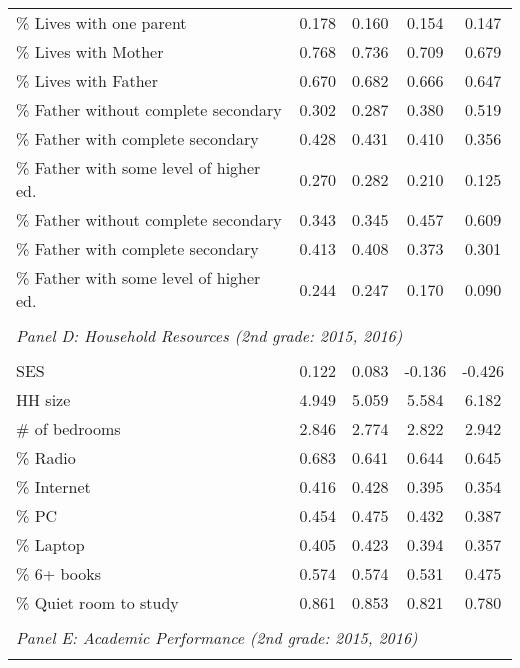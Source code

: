 {\begin{tabular}{lcccc}
\% Lives with one parent&       0.178&       0.160&       0.154&       0.147\\
\% Lives with Mother&       0.768&       0.736&       0.709&       0.679\\
\% Lives with Father&       0.670&       0.682&       0.666&       0.647\\
\% Father without complete secondary&       0.302&       0.287&       0.380&       0.519\\
\% Father with complete secondary&       0.428&       0.431&       0.410&       0.356\\
\% Father with some level of higher ed.&       0.270&       0.282&       0.210&       0.125\\
\% Father without complete secondary&       0.343&       0.345&       0.457&       0.609\\
\% Father with complete secondary&       0.413&       0.408&       0.373&       0.301\\
\% Father with some level of higher ed.&       0.244&       0.247&       0.170&       0.090\\
&  &  &   \\
\multicolumn{4}{l}{\textit{Panel D: Household Resources (2nd grade: 2015, 2016)}} \\
            &            &            &            &            \\
SES         &       0.122&       0.083&      -0.136&      -0.426\\
HH size     &       4.949&       5.059&       5.584&       6.182\\
\# of bedrooms&       2.846&       2.774&       2.822&       2.942\\
\% Radio    &       0.683&       0.641&       0.644&       0.645\\
\% Internet &       0.416&       0.428&       0.395&       0.354\\
\% PC       &       0.454&       0.475&       0.432&       0.387\\
\% Laptop   &       0.405&       0.423&       0.394&       0.357\\
\% 6+ books &       0.574&       0.574&       0.531&       0.475\\
\% Quiet room to study&       0.861&       0.853&       0.821&       0.780\\
&  &  &   \\
\multicolumn{4}{l}{\textit{Panel E: Academic Performance (2nd grade: 2015, 2016)}} \\
            &            &            &            &            \\

\end{tabular}}
